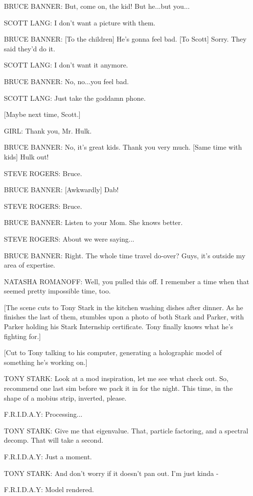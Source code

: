 BRUCE BANNER: But, come on, the kid! But he...but you...

SCOTT LANG: I don't want a picture with them.

BRUCE BANNER: [To the children] He's gonna feel bad. [To Scott] Sorry. They said they'd do it.

SCOTT LANG: I don't want it anymore.

BRUCE BANNER: No, no...you feel bad.

SCOTT LANG: Just take the goddamn phone.

[Maybe next time, Scott.]

GIRL: Thank you, Mr. Hulk.

BRUCE BANNER: No, it's great kids. Thank you very much. [Same time with kids] Hulk out!

STEVE ROGERS: Bruce.

BRUCE BANNER: [Awkwardly] Dab!

STEVE ROGERS: Bruce.

BRUCE BANNER: Listen to your Mom. She knows better.

STEVE ROGERS: About we were saying...

BRUCE BANNER: Right. The whole time travel do-over? Guys, it's outside my area of expertise.

NATASHA ROMANOFF: Well, you pulled this off. I remember a time when that seemed pretty impossible time, too.

[The scene cuts to Tony Stark in the kitchen washing dishes after dinner. As he finishes the last of them, stumbles upon a photo of both Stark and Parker, with Parker holding his Stark Internship certificate. Tony finally knows what he's fighting for.]

[Cut to Tony talking to his computer, generating a holographic model of something he's working on.]

TONY STARK: Look at a mod inspiration, let me see what check out. So, recommend one last sim before we pack it in for the night. This time, in the shape of a mobius strip, inverted, please.

F.R.I.D.A.Y: Processing...

TONY STARK: Give me that eigenvalue. That, particle factoring, and a spectral decomp. That will take a second.

F.R.I.D.A.Y: Just a moment.

TONY STARK: And don't worry if it doesn't pan out. I'm just kinda -

F.R.I.D.A.Y: Model rendered.


